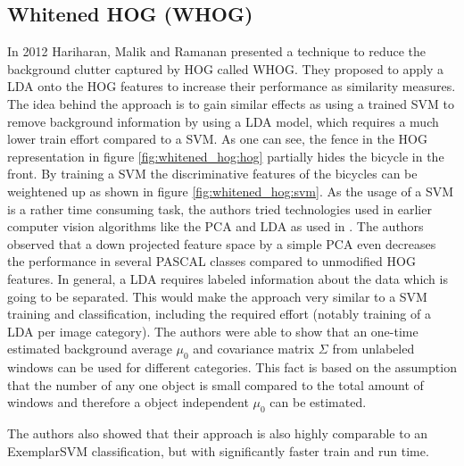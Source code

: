 \subsection{Whitened HOG (WHOG)}
\label{sec:whitened_hog}

In 2012 Hariharan, Malik and Ramanan presented a technique \cite{Hariharan2012} to reduce the background clutter captured by \ac{HOG} called \acf{WHOG}. They proposed to apply a \ac{LDA} onto the \ac{HOG} features to increase their performance as similarity measures. The idea behind the approach is to gain similar effects as using a trained \ac{SVM} to remove background information by using a \ac{LDA} model, which requires a much lower train effort compared to a \ac{SVM}. As one can see, the fence in the \ac{HOG} representation in figure \ref{fig:whitened_hog:hog} partially hides the bicycle in the front. By training a \ac{SVM} the discriminative features of the bicycles can be weightened up as shown in figure \ref{fig:whitened_hog:svm}. As the usage of a \ac{SVM} is a rather time consuming task, the authors tried technologies used in earlier computer vision algorithms like the \ac{PCA} \cite{jolliffe2002principal} and \ac{LDA} as used in \cite{ahonen2006face}. The authors observed that a down projected feature space by a simple \ac{PCA} even decreases the performance in several PASCAL \cite{Pascal2007} classes compared to unmodified \ac{HOG} features. In general, a \ac{LDA} requires labeled information about the data which is going to be separated. This would make the approach very similar to a \ac{SVM} training and classification, including the required effort (notably training of a \ac{LDA} per image category). The authors were able to show that an one-time estimated background average $\mu_0$ and covariance matrix $\Sigma$ from unlabeled windows can be used for different categories. This fact is based on the assumption that the number of any one object is small compared to the total amount of windows and therefore a object independent $\mu_0$ can be estimated.

The authors also showed that their approach is also highly comparable to an ExemplarSVM classification, but with significantly faster train and run time. 

